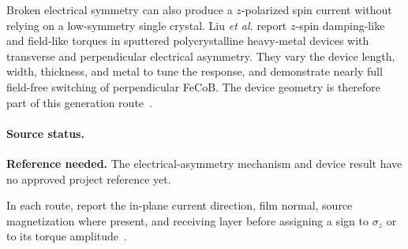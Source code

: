 Broken electrical symmetry can also produce a $z$-polarized spin current
without relying on a low-symmetry single crystal.  Liu \emph{et al.} report
$z$-spin damping-like and field-like torques in sputtered polycrystalline
heavy-metal devices with transverse and perpendicular electrical asymmetry.
They vary the device length, width, thickness, and metal to tune the response,
and demonstrate nearly full field-free switching of perpendicular FeCoB.
The device geometry is therefore part of this generation
route~\cite{liu2024electric-asymmetry}.

\paragraph{Source status.}
\textbf{Reference needed.}  The electrical-asymmetry mechanism and device
result have no approved project reference yet.

In each route, report the in-plane current direction, film normal, source
magnetization where present, and receiving layer before assigning a sign to
$\sigma_z$ or to its torque amplitude~\cite{ee237-week11,
    sot-stt-compact-model}.
